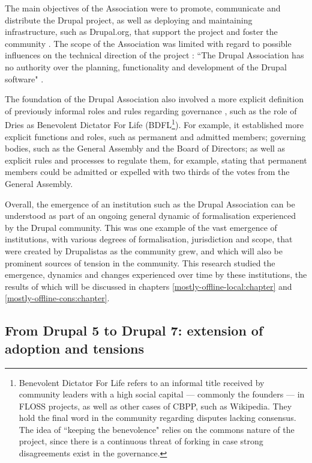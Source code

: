 The main objectives of the Association were to promote, communicate and distribute the Drupal project, as well as deploying and maintaining infrastructure, such as Drupal.org, that support the project and foster the community \parencite[3-5]{drupal-vzw-statuses:2016:Online}. The scope of the Association was limited with regard to possible influences on the technical direction of the project \parencite{benjamin2011definitive}: ``The Drupal Association has no authority over the planning, functionality and development of the Drupal software" \parencite{drupal-association-about:2013:Online}. 

The foundation of the Drupal Association also involved a more explicit definition of previously informal roles and rules regarding governance \parencite[6-10]{drupal-vzw-statuses:2016:Online}, such as the role of Dries as Benevolent Dictator For Life (BDFL\footnote{\label{bdfl} Benevolent Dictator For Life \parencite[225-226]{benkler2013practical} refers to an informal title received by community leaders with a high social capital --- commonly the founders --- in FLOSS projects, as well as other cases of CBPP, such as Wikipedia. They hold the final word in the community regarding disputes lacking consensus. The idea of ``keeping the benevolence" relies on the commons nature of the project, since there is a continuous threat of forking in case strong disagreements exist in the governance.}). For example, it established more explicit functions and roles, such as permanent and admitted members; governing bodies, such as the General Assembly and the Board of Directors; as well as explicit rules and processes to regulate them, for example, stating that permanent members could be admitted or expelled with two thirds of the votes from the General Assembly.

Overall, the emergence of an institution such as the Drupal Association can be understood as part of an ongoing general dynamic of formalisation experienced by the Drupal community. This was one example of the vast emergence of institutions, with various degrees of formalisation, jurisdiction and scope, that were created by Drupalistas as the community grew, and which will also be prominent sources of tension in the community. This research studied the emergence, dynamics and changes experienced over time by these institutions, the results of which will be discussed in chapters \ref{mostly-offline-local:chapter} and \ref{mostly-offline-cons:chapter}.

\subsection{From Drupal 5 to Drupal 7: extension of adoption and tensions}

